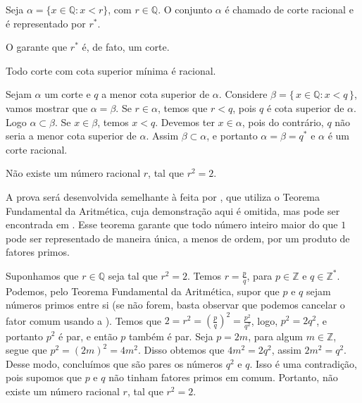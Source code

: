 \documentclass[../main.tex]{subfiles}
\begin{document}
\begin{defi}
    Seja $\alpha = \{ x \in \mathbb{Q} : x < r \}$, com $r \in \mathbb{Q}$. O conjunto $\alpha$ é chamado de corte racional e é representado por $r^*$.
\end{defi}

\begin{obs}
    O  garante que $r^*$ é, de fato, um corte.
\end{obs}

\begin{teo}
    Todo corte com cota superior mínima é racional.
\end{teo}
\begin{dem}
    Sejam $\alpha$ um corte e $q$ a menor cota superior de $\alpha$. Considere $\beta = \{\, x \in \mathbb{Q} : x < q \,\}$, vamos mostrar que $\alpha = \beta$.
    Se $r \in \alpha$, temos que $r < q$, pois $q$ é cota superior de $\alpha$. Logo $\alpha \subset \beta$. Se $x \in \beta$, temos $x < q$. Devemos ter $x \in \alpha$, pois do contrário, $q$ não seria a menor cota superior de $\alpha$. Assim $\beta \subset \alpha$, e portanto $\alpha = \beta = q^*$ e $\alpha$ é um corte racional.
\end{dem}

\begin{prop}\label{reais-prop-raizQuadradaDoisIrracional}
    Não existe um número racional $r$, tal que $r^2 = 2$.
\end{prop}
\begin{dem}
    A prova será desenvolvida semelhante à feita por \textcite{alfeld}, que utiliza o Teorema Fundamental da Aritmética, cuja demonstração aqui é omitida, mas pode ser encontrada em \textcite[p. 9]{santos}. Esse teorema garante que todo número inteiro maior do que $1$ pode ser representado de maneira única, a menos de ordem, por um produto de fatores primos.    
    
    Suponhamos que $r \in \mathbb{Q}$ seja tal que $r^2 = 2$. Temos $r = \frac{p}{q}$, para $p \in \mathbb{Z}$ e $q \in \mathbb{Z}^*$. Podemos, pelo Teorema Fundamental da Aritmética, supor que $p$ e $q$ sejam números primos entre si (se não forem, basta observar que podemos cancelar o fator comum usando a ). Temos que $2 = r^2 = \left( \frac{p}{q} \right)^2 = \frac{p^2}{q^2}$, logo, $p^2 = 2q^2$, e portanto $p^2$ é par, e então $p$ também é par. Seja $p = 2m$, para algum $m \in \mathbb{Z}$, segue que $p^2= (2m)^2 = 4m^2$. Disso obtemos que $4m^2 = 2q^2$, assim $2m^2 = q^2$. Desse modo, concluímos que são pares os números $q^2$ e $q$. Isso é uma contradição, pois supomos que $p$ e $q$ não tinham fatores primos em comum. Portanto, não existe um número racional $r$, tal que $r^2 = 2$.

    
\end{dem}
\end{document}
